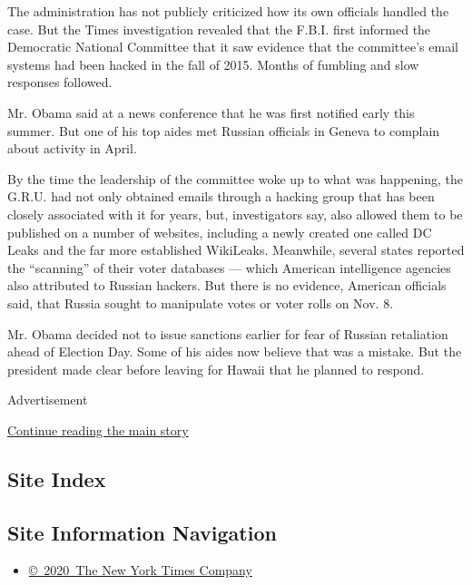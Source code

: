 The administration has not publicly criticized how its own officials
handled the case. But the Times investigation revealed that the F.B.I.
first informed the Democratic National Committee that it saw evidence
that the committee's email systems had been hacked in the fall of 2015.
Months of fumbling and slow responses followed.

Mr. Obama said at a news conference that he was first notified early
this summer. But one of his top aides met Russian officials in Geneva to
complain about activity in April.

By the time the leadership of the committee woke up to what was
happening, the G.R.U. had not only obtained emails through a hacking
group that has been closely associated with it for years, but,
investigators say, also allowed them to be published on a number of
websites, including a newly created one called DC Leaks and the far more
established WikiLeaks. Meanwhile, several states reported the
``scanning'' of their voter databases --- which American intelligence
agencies also attributed to Russian hackers. But there is no evidence,
American officials said, that Russia sought to manipulate votes or voter
rolls on Nov. 8.

Mr. Obama decided not to issue sanctions earlier for fear of Russian
retaliation ahead of Election Day. Some of his aides now believe that
was a mistake. But the president made clear before leaving for Hawaii
that he planned to respond.

Advertisement

\protect\hyperlink{after-bottom}{Continue reading the main story}

\hypertarget{site-index}{%
\subsection{Site Index}\label{site-index}}

\hypertarget{site-information-navigation}{%
\subsection{Site Information
Navigation}\label{site-information-navigation}}

\begin{itemize}
\tightlist
\item
  \href{https://help.nytimes3xbfgragh.onion/hc/en-us/articles/115014792127-Copyright-notice}{©~2020~The
  New York Times Company}
\end{itemize}

